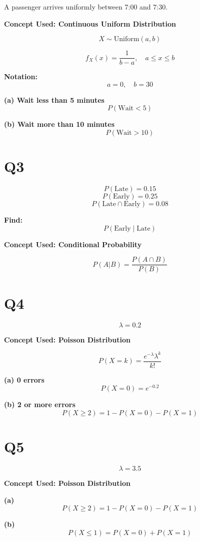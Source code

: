 \documentclass[12pt]{article}
\begin{document}
A passenger arrives uniformly between 7:00 and 7:30.

\textbf{Concept Used: Continuous Uniform Distribution}

\[
X \sim \text{Uniform}(a,b)
\]

\[
f_X(x) = \frac{1}{b-a}, \quad a \le x \le b
\]

\textbf{Notation:}
\[
a = 0, \quad b = 30
\]

\textbf{(a) Wait less than 5 minutes}
\[
P(\text{Wait} < 5)
\]

\textbf{(b) Wait more than 10 minutes}
\[
P(\text{Wait} > 10)
\]

\section*{Q3}

\[
P(\text{Late}) = 0.15
\]
\[
P(\text{Early}) = 0.25
\]
\[
P(\text{Late} \cap \text{Early}) = 0.08
\]

\textbf{Find:}
\[
P(\text{Early} \mid \text{Late})
\]

\textbf{Concept Used: Conditional Probability}

\[
P(A|B) = \frac{P(A \cap B)}{P(B)}
\]

\section*{Q4}

\[
\lambda = 0.2
\]

\textbf{Concept Used: Poisson Distribution}

\[
P(X=k) = \frac{e^{-\lambda} \lambda^k}{k!}
\]

\textbf{(a) 0 errors}
\[
P(X=0) = e^{-0.2}
\]

\textbf{(b) 2 or more errors}
\[
P(X \ge 2) = 1 - P(X=0) - P(X=1)
\]

\newpage
\section*{Q5}

\[
\lambda = 3.5
\]

\textbf{Concept Used: Poisson Distribution}

\textbf{(a)}
\[
P(X \ge 2) = 1 - P(X=0) - P(X=1)
\]

\textbf{(b)}
\[
P(X \le 1) = P(X=0) + P(X=1)
\]
\end{document}

